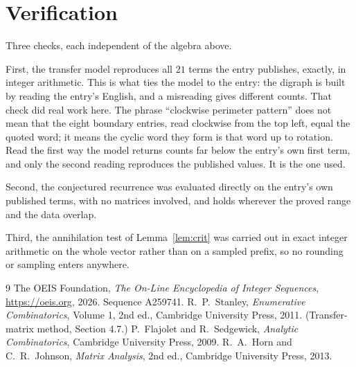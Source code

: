 \documentclass[11pt,a4paper]{article}
\theoremstyle{plain}
\theoremstyle{definition}
\begin{document}
\section{Verification}

Three checks, each independent of the algebra above.

First, the transfer model reproduces all $21$ terms the entry publishes, exactly, in
integer arithmetic. This is what ties the model to the entry: the digraph is built by reading
the entry's English, and a misreading gives different counts. That check did real work here. The phrase ``clockwise perimeter pattern'' does not mean that the eight boundary entries, read clockwise from the top left, equal the quoted word; it means the cyclic word they form is that word up to rotation. Read the first way the model returns counts far below the entry's own first term, and only the second reading reproduces the published values. It is the one used.

Second, the conjectured recurrence was evaluated directly on the entry's own published terms,
with no matrices involved, and holds wherever the proved range and the data overlap.

Third, the annihilation test of Lemma~\ref{lem:crit} was carried out in exact integer
arithmetic on the whole vector rather than on a sampled prefix, so no rounding or sampling
enters anywhere.

\begin{thebibliography}{9}
 The OEIS Foundation, \emph{The On-Line Encyclopedia of Integer
Sequences}, \url{https://oeis.org}, 2026. Sequence A259741.
 R.~P.~Stanley, \emph{Enumerative Combinatorics}, Volume 1, 2nd ed.,
Cambridge University Press, 2011. (Transfer-matrix method, Section 4.7.)
 P.~Flajolet and R.~Sedgewick, \emph{Analytic Combinatorics}, Cambridge
University Press, 2009.
 R.~A.~Horn and C.~R.~Johnson, \emph{Matrix Analysis}, 2nd ed., Cambridge
University Press, 2013.
\end{thebibliography}
\end{document}
